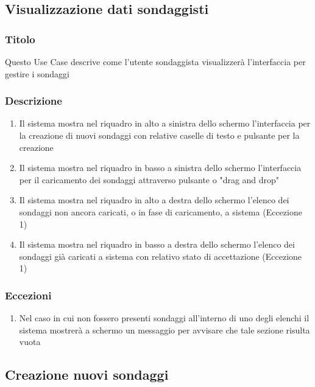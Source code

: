     \subsection{Visualizzazione dati sondaggisti}
        \subsubsection{Titolo}
            Questo Use Case descrive come l'utente sondaggista visualizzerà l'interfaccia per gestire i sondaggi
        \subsubsection{Descrizione}
            \begin{enumerate}
                \item Il sistema mostra nel riquadro in alto a sinistra dello schermo l'interfaccia per la creazione di nuovi sondaggi con relative caselle di testo e pulsante per la creazione
                \item Il sistema mostra nel riquadro in basso a sinistra dello schermo l'interfaccia per il caricamento dei sondaggi attraverso pulsante o "drag and drop"
                \item Il sistema mostra nel riquadro in alto a destra dello schermo l'elenco dei sondaggi non ancora caricati, o in fase di caricamento, a sistema (Eccezione 1)
                \item Il sistema mostra nel riquadro in basso a destra dello schermo l'elenco dei sondaggi già caricati a sistema con relativo stato di accettazione (Eccezione 1)
            \end{enumerate}
        \subsubsection{Eccezioni}
            \begin{enumerate}
                \item Nel caso in cui non fossero presenti sondaggi all'interno di uno degli elenchi il sistema mostrerà a schermo un messaggio per avvisare che tale sezione risulta vuota
            \end{enumerate}
    
    \subsection{Creazione nuovi sondaggi} %
